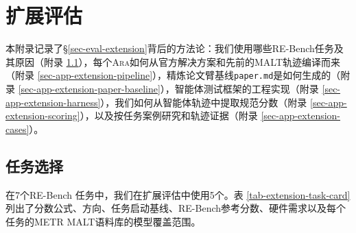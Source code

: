 \documentclass[
]{article}
\newcommand{\passthrough}[1]{#1}
\theoremstyle{definition}
\newcommand{\ara}{\textsc{Ara}}
\begin{document}
\section{扩展评估}\label{sec-app-extension-eval}

本附录记录了\S\ref{sec-eval-extension}背后的方法论：我们使用哪些RE-Bench任务及其原因（附录
\ref{sec-app-extension-tasks}），每个\ara{}如何从官方解决方案和先前的MALT轨迹编译而来（附录
\ref{sec-app-extension-pipeline}），精炼论文臂基线\passthrough{\lstinline!paper.md!}是如何生成的（附录
\ref{sec-app-extension-paper-baseline}），智能体测试框架的工程实现（附录
\ref{sec-app-extension-harness}），我们如何从智能体轨迹中提取规范分数（附录
\ref{sec-app-extension-scoring}），以及按任务案例研究和轨迹证据（附录
\ref{sec-app-extension-cases}）。

\subsection{任务选择}\label{sec-app-extension-tasks}

在7个RE-Bench \citep{wijk2025rebench}任务中，我们在扩展评估中使用5个。表
\ref{tab-extension-task-card}列出了分数公式、方向、任务启动基线、RE-Bench参考分数、硬件需求以及每个任务的METR
MALT语料库的模型覆盖范围。
\end{document}
